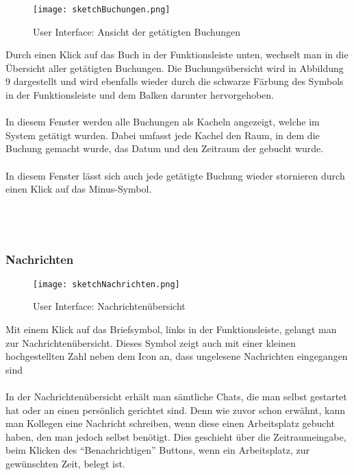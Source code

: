 \begin{wrapfigure}{r}{5.5cm}
  \texttt{[image: sketchBuchungen.png]}
  \caption{User Interface: Ansicht der getätigten Buchungen}
\end{wrapfigure}

Durch einen Klick auf das Buch in der Funktionsleiste unten, wechselt man in die Übersicht aller getätigten Buchungen.
Die Buchungsübersicht wird in Abbildung 9 dargestellt und wird ebenfalls wieder durch die schwarze Färbung des Symbols in der Funktionsleiste und dem Balken darunter hervorgehoben. \\
\paragraph{}In diesem Fenster werden alle Buchungen als Kacheln angezeigt, welche im System getätigt wurden.
Dabei umfasst jede Kachel den Raum, in dem die Buchung gemacht wurde, das Datum und den Zeitraum der gebucht wurde. \\
\paragraph{}In diesem Fenster lässt sich auch jede getätigte Buchung wieder stornieren durch einen Klick auf das Minus-Symbol.
\\
\\
\\
\\
\newpage
\subsubsection{Nachrichten}

\begin{wrapfigure}{r}{5.5cm}
  \texttt{[image: sketchNachrichten.png]}
  \caption{User Interface: Nachrichtenübersicht}
\end{wrapfigure}

Mit einem Klick auf das Briefsymbol, links in der Funktionsleiste, gelangt man zur Nachrichtenübersicht.
Dieses Symbol zeigt auch mit einer kleinen hochgestellten Zahl neben dem Icon an, dass ungelesene Nachrichten eingegangen sind
\paragraph{}In der Nachrichtenübersicht erhält man sämtliche Chats, die man selbst gestartet hat oder an einen persönlich gerichtet sind. 
Denn wie zuvor schon erwähnt, kann man Kollegen eine Nachricht schreiben, wenn diese einen Arbeitsplatz gebucht haben, den man jedoch selbst benötigt. 
Dies geschieht über die Zeitraumeingabe, beim Klicken des "`Benachrichtigen"' Buttons, wenn ein Arbeitsplatz, zur gewünschten Zeit, belegt ist.
